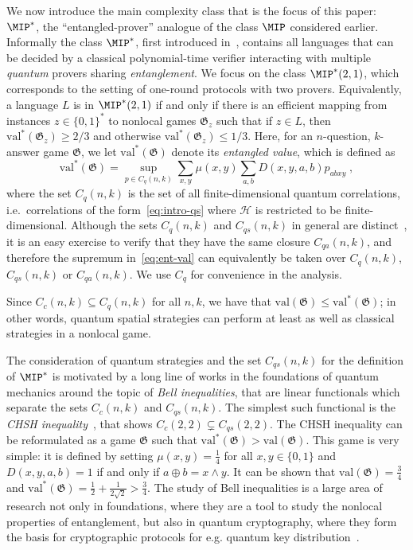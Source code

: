 \documentclass[11pt]{article}
\theoremstyle{definition}
\newcommand{\mH}{\ensuremath{\mathcal{H}}}
\newcommand{\val}{\ensuremath{\mathrm{val}}}
\newcommand{\game}{\mathfrak{G}}
\begin{document}
We now introduce the main complexity class that is the focus of this paper: $\MIP^*$, the  ``entangled-prover'' analogue of the class $\MIP$ considered earlier. Informally the class $\MIP^*$, first introduced in~\cite{cleve2004consequences}, contains all languages that can be decided by a classical polynomial-time verifier interacting with multiple \emph{quantum} provers sharing \emph{entanglement}. We focus on the class $\MIP^*(2,1)$, which corresponds to the setting of one-round protocols with two  provers. Equivalently, a language $L$ is in $\MIP^*(2,1)$ if and only if there is an efficient mapping from instances $z\in\{0,1\}^*$ to nonlocal games $\game_z$ such that if $z \in L$, then $\val^*(\game_z) \geq 2/3$ and otherwise $\val^*(\game_z) \leq 1/3$. Here, for an $n$-question, $k$-answer game $\game$, we let $\val^*(\game)$ denote its \emph{entangled value}, which is defined as
\begin{equation}\label{eq:ent-val}
 \val^*(\game) = \sup_{p\in C_{q}(n,k)} \sum_{x,y} \mu(x,y) \sum_{a,b} D(x,y,a,b) p_{abxy}\;,
\end{equation}
where the set $C_{q}(n,k)$ is the set of all finite-dimensional quantum correlations, i.e.\ correlations of the form~\eqref{eq:intro-qs} where $\mH$ is restricted to be finite-dimensional. Although the sets $C_q(n,k)$ and $C_{qs}(n,k)$ in general are distinct~\cite{coladangelo2018unconditional}, it is an easy exercise to verify that they have the same closure $C_{qa}(n,k)$, and therefore the supremum in~\eqref{eq:ent-val} can equivalently be taken over $C_q(n,k)$, $C_{qs}(n,k)$ or $C_{qa}(n,k)$. We use $C_q$ for convenience in the analysis.


Since $C_c(n,k) \subseteq C_{q}(n,k)$ for all $n,k$, we have that $\val(\game) \leq \val^*(\game)$; in other words, quantum spatial strategies can perform at least as well as classical strategies in a nonlocal game. 



The consideration of quantum strategies and the set $C_{qs}(n,k)$ for the definition of $\MIP^*$ is motivated by a long line of works in the foundations of quantum mechanics around the topic of \emph{Bell inequalities}, that are linear functionals which separate the sets $C_{c}(n,k)$ and $C_{qs}(n,k)$. The simplest such functional is the \emph{CHSH inequality}~\cite{clauser1969proposed}, that shows $C_c(2,2) \subsetneq C_{qs}(2,2)$. The CHSH inequality can be reformulated as a game $\game$ such that $\val^*(\game) > \val(\game)$. This game is very simple: it is defined by setting $\mu(x,y)=\frac{1}{4}$ for all $x,y\in\{0,1\}$ and $D(x,y,a,b)=1$ if and only if $a\oplus b = x\wedge y$. It can be shown that $\val(\game) = \frac{3}{4}$ and $\val^*(\game) = \frac{1}{2} + \frac{1}{2\sqrt{2}} > \frac{3}{4}$. The study of Bell inequalities is a large area of research not only in foundations, where they are a tool to study the nonlocal properties of entanglement, but also in quantum cryptography, where they form the basis for cryptographic protocols for e.g. quantum key distribution~\cite{ekert1991quantum}. 
\end{document}
